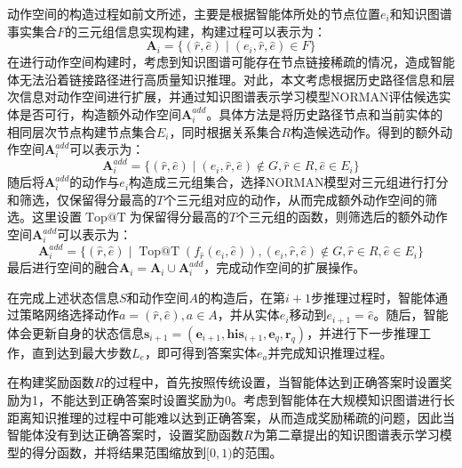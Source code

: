\documentclass[algorithmlist, AutoFakeBold, AutoFakeSlant, figurelist, tablelist, nomlist, engineering]{seuthesix}
\begin{document}
动作空间的构造过程如前文所述，主要是根据智能体所处的节点位置$e_i$和知识图谱事实集合$F$的三元组信息实现构建，构建过程可以表示为：
\begin{equation}
  \bm{A}_i = \{(\hat{r}, \hat{e}) \mid (e_i, \hat{r}, \hat{e}) \in F\}
  \label{base_1}
\end{equation}
在进行动作空间构建时，考虑到知识图谱可能存在节点链接稀疏的情况，造成智能体无法沿着链接路径进行高质量知识推理。对此，本文考虑根据历史路径信息和层次信息对动作空间进行扩展，并通过知识图谱表示学习模型NORMAN评估候选实体是否可行，构造额外动作空间$\bm{A}_{i}^{add}$。具体方法是将历史路径节点和当前实体的相同层次节点构建节点集合$E_i$，同时根据关系集合$R$构造候选动作。得到的额外动作空间$\bm{A}_{i}^{add}$可以表示为：
\begin{equation}
  \bm{A}_{i}^{add} = \{(\hat{r}, \hat{e}) \mid (e_i, \hat{r}, \hat{e}) \notin G, \hat{r} \in R, \hat{e} \in E_i \}
  \label{extra_1}
\end{equation}
随后将$\bm{A}_{i}^{add}$的动作与$e_i$构造成三元组集合，选择NORMAN模型对三元组进行打分和筛选，仅保留得分最高的$T$个三元组对应的动作，从而完成额外动作空间的筛选。这里设置$\operatorname{Top@T}$为保留得分最高的$T$个三元组的函数，则筛选后的额外动作空间$\bm{A}_{i}^{add}$可以表示为：
\begin{equation}
  \bm{A}_i^{add} = \{(\hat{r}, \hat{e}) \mid \operatorname{Top@T}(f_{\hat{r}}(e_i, \hat{e})), (e_i, \hat{r}, \hat{e}) \notin G, \hat{r} \in R, \hat{e} \in E_i \}
\end{equation}
最后进行空间的融合$\bm{A}_i = \bm{A}_i \cup \bm{A}_{i}^{add} $，完成动作空间的扩展操作。

在完成上述状态信息$S$和动作空间$A$的构造后，在第$i+1$步推理过程时，智能体通过策略网络选择动作$a = (\hat{r}, \hat{e}), a \in A$，并从实体$e_i$移动到$e_{i+1} = \hat{e}$。随后，智能体会更新自身的状态信息$\bm{s}_{i+1} = (\bm{e}_{i+1}, \bm{his}_{i+1}, \bm{e}_q, \bm{r}_q)$，并进行下一步推理工作，直到达到最大步数$L_e$，即可得到答案实体$e_a$并完成知识推理过程。

在构建奖励函数$R$的过程中，首先按照传统设置，当智能体达到正确答案时设置奖励为1，不能达到正确答案时设置奖励为0。考虑到智能体在大规模知识图谱进行长距离知识推理的过程中可能难以达到正确答案，从而造成奖励稀疏的问题，因此当智能体没有到达正确答案时，设置奖励函数$R$为第二章提出的知识图谱表示学习模型的得分函数，并将结果范围缩放到$[0, 1)$的范围。
\end{document}
